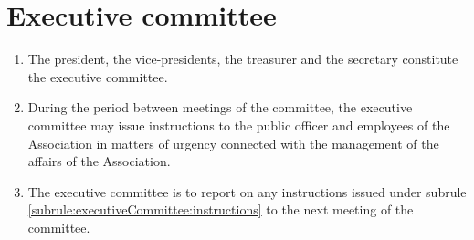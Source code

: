 \section{Executive committee}
\label{rule:executiveCommittee}

\begin{enumerate}
	\item The president, the vice-presidents, the treasurer and the secretary constitute the executive committee.
	\item \label{subrule:executiveCommittee:instructions} During the period between meetings of the committee, the executive committee may issue instructions to the public officer and employees of the Association in matters of urgency connected with the management of the affairs of the Association.
	\item The executive committee is to report on any instructions issued under subrule \ref{subrule:executiveCommittee:instructions} to the next meeting of the committee.
\end{enumerate}